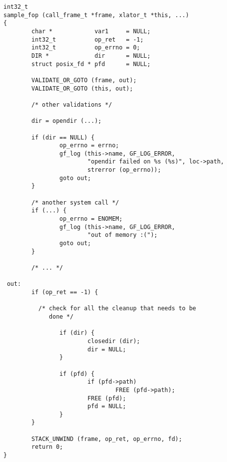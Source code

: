 \documentclass{article}[12pt]
\begin{document}
\begin{verbatim}
int32_t 
sample_fop (call_frame_t *frame, xlator_t *this, ...)
{
        char *            var1     = NULL;
        int32_t           op_ret   = -1;
        int32_t           op_errno = 0;
        DIR *             dir      = NULL;
        struct posix_fd * pfd      = NULL;

        VALIDATE_OR_GOTO (frame, out);
        VALIDATE_OR_GOTO (this, out);

        /* other validations */
        
        dir = opendir (...);

        if (dir == NULL) {
                op_errno = errno;
                gf_log (this->name, GF_LOG_ERROR, 
                        "opendir failed on %s (%s)", loc->path, 
                        strerror (op_errno));
                goto out;
        }

        /* another system call */
        if (...) {
                op_errno = ENOMEM;
                gf_log (this->name, GF_LOG_ERROR,
                        "out of memory :(");
                goto out;
        }

        /* ... */

 out:
        if (op_ret == -1) {

          /* check for all the cleanup that needs to be
             done */

                if (dir) {
                        closedir (dir);
                        dir = NULL;
                }     
        
                if (pfd) {
                        if (pfd->path)
                                FREE (pfd->path);
                        FREE (pfd);
                        pfd = NULL;
                }
        }

        STACK_UNWIND (frame, op_ret, op_errno, fd);
        return 0;
}
\end{verbatim}
\end{document}
